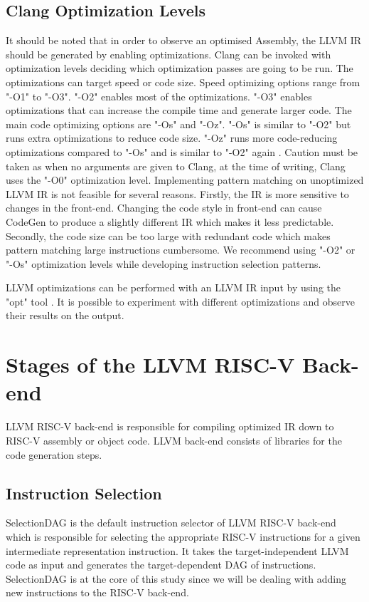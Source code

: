 \subsection{Clang Optimization Levels}
It should be noted that in order to observe an optimised Assembly, the LLVM IR should be generated by enabling optimizations.
Clang can be invoked with optimization levels deciding which optimization passes are going to be run. The optimizations can target speed or code size. Speed optimizing options range from "-O1" to "-O3". "-O2" enables most of the optimizations. "-O3" enables optimizations that can increase the compile time and generate larger code. The main code optimizing options are "-Os" and "-Oz". "-Os" is similar to "-O2" but runs extra optimizations to reduce code size. "-Oz" runs more code-reducing optimizations compared to "-Os" and is similar to "-O2" again \cite{clangCommands}.
Caution must be taken as when no arguments are given to Clang, at the time of writing, Clang uses the "-O0" optimization level. Implementing pattern matching on unoptimized LLVM IR is not feasible for several reasons. Firstly, the IR is more sensitive to changes in the front-end. Changing the code style in front-end can cause CodeGen to produce a slightly different IR which makes it less predictable. Secondly, the code size can be too large with redundant code which makes pattern matching large instructions cumbersome. We recommend using "-O2" or "-Os" optimization levels while developing instruction selection patterns. 

LLVM optimizations can be performed with an LLVM IR input by using the "opt" tool \cite{optimizer}. It is possible to experiment with different optimizations and observe their results on the output.

\section{Stages of the LLVM RISC-V Back-end}
LLVM RISC-V back-end is responsible for compiling optimized IR down to RISC-V assembly or object code. LLVM back-end consists of libraries for the code generation steps\cite{llvmbackend}.

\subsection{Instruction Selection}
SelectionDAG is the default instruction selector of LLVM RISC-V back-end which is responsible for selecting the appropriate RISC-V instructions for a given intermediate representation instruction. It takes the target-independent LLVM code as input and generates the target-dependent DAG of instructions. SelectionDAG is at the core of this study since we will be dealing with adding new instructions to the RISC-V back-end. 



